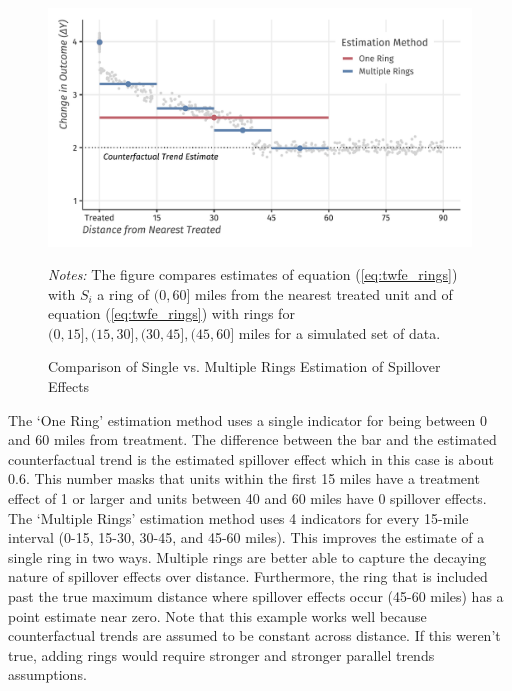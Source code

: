 \documentclass[11pt]{article}
\begin{document}
\begin{figure}[tb!]
    \caption{Comparison of Single vs. Multiple Rings Estimation of Spillover Effects}
    \label{fig:example_rings}

    \includegraphics[width = \textwidth]{../../figures/figure-rings_v_within.pdf}

    {\footnotesize \textit{Notes:} The figure compares estimates of equation (\ref{eq:twfe_rings}) with $S_i$ a ring of $(0, 60]$ miles from the nearest treated unit and of equation (\ref{eq:twfe_rings}) with rings for $(0,15], (15,30], (30,45], (45, 60]$ miles for a simulated set of data.}
\end{figure}

The `One Ring' estimation method uses a single indicator for being between 0 and 60 miles from treatment. The difference between the bar and the estimated counterfactual trend is the estimated spillover effect which in this case is about 0.6. This number masks that units within the first 15 miles have a treatment effect of 1 or larger and units between 40 and 60 miles have 0 spillover effects. The `Multiple Rings' estimation method uses 4 indicators for every 15-mile interval (0-15, 15-30, 30-45, and 45-60 miles). This improves the estimate of a single ring in two ways. Multiple rings are better able to capture the decaying nature of spillover effects over distance. Furthermore, the ring that is included past the true maximum distance where spillover effects occur (45-60 miles) has a point estimate near zero. Note that this example works well because counterfactual trends are assumed to be constant across distance. If this weren't true, adding rings would require stronger and stronger parallel trends assumptions.
\end{document}
